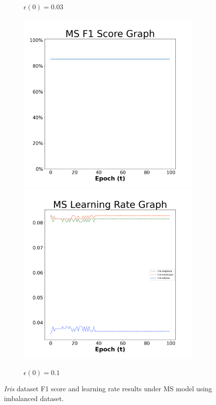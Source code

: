 \begin{figure}[H]
\begin{subfigure}{0.3\textwidth}
  \caption{$\epsilon(0)=0.03$}
\end{subfigure}\hfil %
\begin{subfigure}{0.3\textwidth}
  \includegraphics[width=\linewidth]{images/exper2/iris/MS_0.1_f1.png}
  \includegraphics[width=\linewidth]{images/exper2/iris/MS_0.1_lr.png}
  \caption{$\epsilon(0)=0.1$}
\end{subfigure}

\caption{\textit{Iris} dataset F1 score and learning rate results under MS model using imbalanced dataset.}
\end{figure}

